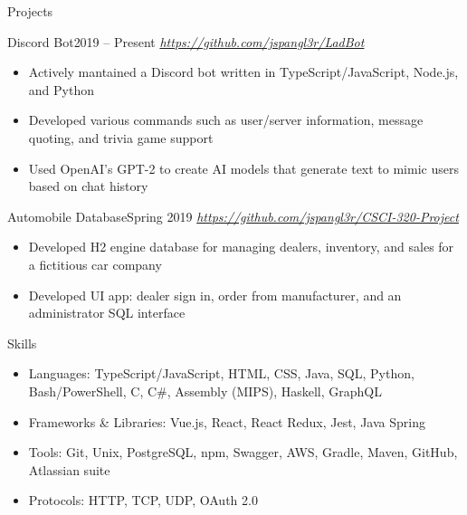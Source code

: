 \documentclass[]{mcdowellcv}
\begin{document}
	\begin{cvsection}{Projects}
		\begin{cvsubsection}{Discord Bot}{}{2019 -- Present}
			\textit{\url{https://github.com/jspangl3r/LadBot}}
			\begin{itemize}
				\item Actively mantained a Discord bot written in TypeScript/JavaScript, Node.js, and Python
				\item Developed various commands such as user/server information, message quoting, and trivia game support
				\item Used OpenAI's GPT-2 to create AI models that generate text to mimic users based on chat history
			\end{itemize}
		\end{cvsubsection}

		\begin{cvsubsection}{Automobile Database}{}{Spring 2019}
			\textit{\url{https://github.com/jspangl3r/CSCI-320-Project}}
			\begin{itemize}
				\item Developed H2 engine database for managing dealers, inventory, and sales for a fictitious car company
				\item Developed UI app: dealer sign in, order from manufacturer, and an administrator SQL interface
			\end{itemize}
		\end{cvsubsection}
	\end{cvsection}

	\begin{cvsection}{Skills}
		\begin{cvsubsection}{}{}{}	
			\begin{itemize}
				\item Languages: TypeScript/JavaScript, HTML, CSS, Java, SQL, Python, Bash/PowerShell, C, C\#, Assembly (MIPS), Haskell, GraphQL 
				\item Frameworks \& Libraries: Vue.js, React, React Redux, Jest, Java Spring
				\item Tools: Git, Unix, PostgreSQL, npm, Swagger, AWS, Gradle, Maven, GitHub, Atlassian suite
				\item Protocols: HTTP, TCP, UDP, OAuth 2.0
			\end{itemize}
		\end{cvsubsection}
	\end{cvsection}
	
\end{document}
